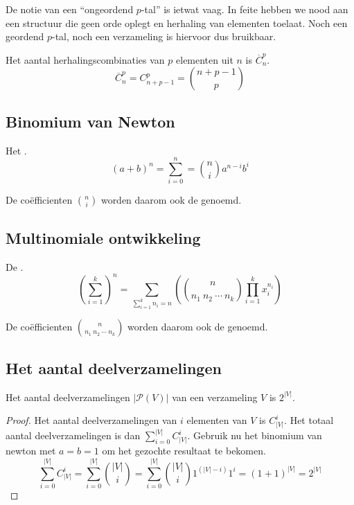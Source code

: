 \documentclass[main.tex]{subfiles}
\begin{document}
\begin{opm}
  De notie van een ``ongeordend $p$-tal'' is ietwat vaag.
  In feite hebben we nood aan een structuur die geen orde oplegt en herhaling van elementen toelaat.
  Noch een geordend $p$-tal, noch een verzameling is hiervoor dus bruikbaar.
\end{opm}

\begin{st}
  Het aantal herhalingscombinaties van $p$ elementen uit $n$ is $\overline{C}_{n}^{p}$.
  \[ \overline{C}_{n}^{p} = C_{n+p-1}^{p} = \binom{n+p-1}{p} \]
\end{st}

\subsection{Binomium van Newton}
\label{sec:binomium-van-newton}

\begin{st}
  Het .
  \[ (a+b)^{n} = \sum_{i=0}^{n} = \binom{n}{i} a^{n-i}b^{i} \]
\end{st}

\begin{de}
  De co\"efficienten $\binom{n}{i}$ worden daarom ook de  genoemd.
\end{de}

\subsection{Multinomiale ontwikkeling}
\label{sec:mult-ontw}

\begin{st}
  De .
  \[ \left(\sum_{i=1}^{k}\right)^{n} = \sum_{\sum_{i=1}^{k}n_{i}=n}\left(\binom{n}{n_{1}\ n_{2}\ \dotsb\ n_{k}}\prod_{i=1}^{k}x_{i}^{n_{i}}\right) \]
\end{st}

\begin{de}
  De co\"efficienten $\binom{n}{n_{1}\ n_{2}\ \dotsb\ n_{k}}$ worden daarom ook de  genoemd.
\end{de}

\subsection{Het aantal deelverzamelingen}
\label{sec:het-aant-deelv}

\begin{st}
  Het aantal deelverzamelingen $|\mathcal{P}(V)|$ van een verzameling $V$ is $2^{|V|}$.

  \begin{proof}
    Het aantal deelverzamelingen van $i$ elementen van $V$ is $C_{|V|}^{i}$.
    Het totaal aantal deelverzamelingen is dan $\sum_{i=0}^{|V|}C_{|V|}^{i}$.
    Gebruik nu het binomium van newton met $a=b=1$ om het gezochte resultaat te bekomen.
    \[ \sum_{i=0}^{|V|}C_{|V|}^{i} = \sum_{i=0}^{|V|}\binom{|V|}{i} = \sum_{i=0}^{|V|}\binom{|V|}{i}1^{(|V|-i)}1^{i} = (1+1)^{|V|} = 2^{|V|} \]
  \end{proof}
\end{st}
\end{document}
